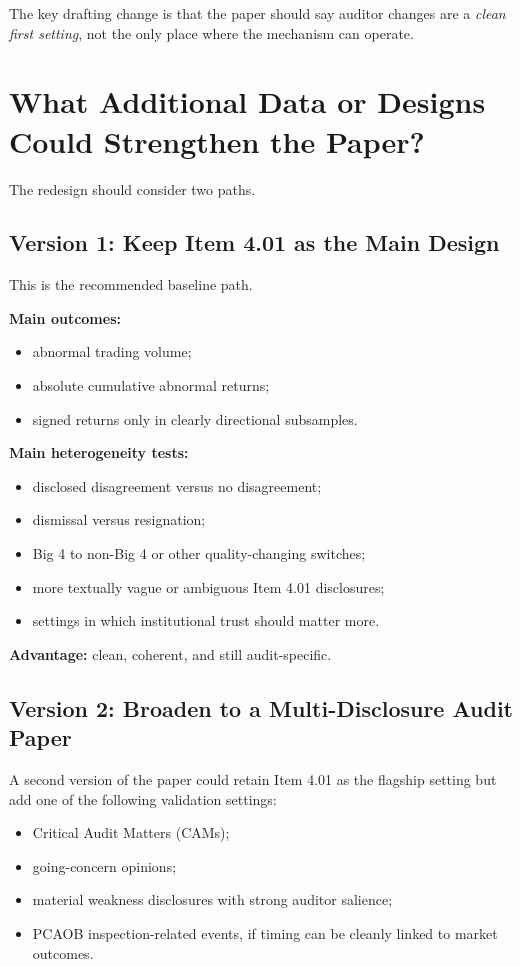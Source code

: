 \documentclass[12pt]{article}
\begin{document}
The key drafting change is that the paper should say auditor changes are a \emph{clean first setting}, not the only place where the mechanism can operate.

\section{What Additional Data or Designs Could Strengthen the Paper?}

The redesign should consider two paths.

\subsection{Version 1: Keep Item 4.01 as the Main Design}

This is the recommended baseline path.

\textbf{Main outcomes:}
\begin{itemize}
    \item abnormal trading volume;
    \item absolute cumulative abnormal returns;
    \item signed returns only in clearly directional subsamples.
\end{itemize}

\textbf{Main heterogeneity tests:}
\begin{itemize}
    \item disclosed disagreement versus no disagreement;
    \item dismissal versus resignation;
    \item Big 4 to non-Big 4 or other quality-changing switches;
    \item more textually vague or ambiguous Item 4.01 disclosures;
    \item settings in which institutional trust should matter more.
\end{itemize}

\textbf{Advantage:} clean, coherent, and still audit-specific.

\subsection{Version 2: Broaden to a Multi-Disclosure Audit Paper}

A second version of the paper could retain Item 4.01 as the flagship setting but add one of the following validation settings:

\begin{itemize}
    \item Critical Audit Matters (CAMs);
    \item going-concern opinions;
    \item material weakness disclosures with strong auditor salience;
    \item PCAOB inspection-related events, if timing can be cleanly linked to market outcomes.
\end{itemize}
\end{document}
